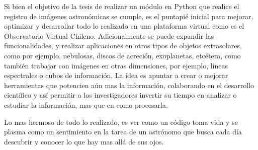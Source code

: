 Si bien el objetivo de la tesis de realizar un módulo en Python que
realice el registro de imágenes astronómicas se cumple, es el puntapié
inicial para mejorar, optimizar y desarrollar todo lo realizado en una
plataforma virtual como es el Observatorio Virtual Chileno.
Adicionalmente se puede expandir las funcionalidades, y realizar
aplicaciones en otros tipos de objetos extrasolares, como por ejemplo,
nebulosas, discos de acreción, exoplanetas, etcétera, como también
trabajar con imágenes en otras dimensiones, por ejemplo, líneas
espectrales o cubos de información. La idea es apuntar a crear o
mejorar herramientas que potencien aún mas la información, colaborando
en el desarrollo científico y así permitir a los investigadores
invertir su tiempo en analizar o estudiar la información, mas que en
como procesarla.

Lo mas hermoso de todo lo realizado, es ver como un código toma vida y
se plasma como un sentimiento en la tarea de un astrónomo que busca
cada día descubrir y conocer lo que hay mas allá de sus ojos.
